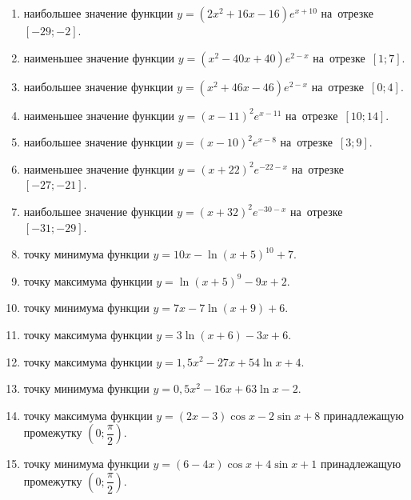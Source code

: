 \documentclass[a4paper,10pt]{article}
\begin{document}
\begin{enumerate}
\item {} наибольшее значение функции $y=\left(2x^2 +16x -16\right)e^{x+10}$ на~отрезке~$\left[-29;-2\right]$.

\item {} наименьшее значение функции $y=\left(x^2 -40x +40\right)e^{2-x}$ на~отрезке~$\left[1;7\right]$.

\item {} наибольшее значение функции $y=\left(x^2 +46x -46\right)e^{2-x}$ на~отрезке~$\left[0;4\right]$.

\item {} наименьшее значение функции $y=\left(x-11\right)^2e^{x-11}$ на~отрезке~$\left[10;14\right]$.

\item {} наибольшее значение функции $y=\left(x-10\right)^2e^{x-8}$ на~отрезке~$\left[3;9\right]$.

\item {} наименьшее значение функции $y=\left(x+22\right)^2e^{-22-x}$ на~отрезке~$\left[-27;-21\right]$.

\item {} наибольшее значение функции $y=\left(x+32\right)^2e^{-30-x}$ на~отрезке~$\left[-31;-29\right]$.

\item {} точку минимума функции $y=10x-\ln\left(x+5\right)^{10}+7$.

\item {} точку максимума функции $y=\ln\left(x+5\right)^{9}-9x+2$.

\item {} точку минимума функции $y=7x-7\ln\left(x+9\right)+6$.

\item {} точку максимума функции $y=3\ln\left(x+6\right)-3x+6$.

\item {} точку максимума функции $y=1,5x^2-27x+54\ln x +4$.

\item {} точку минимума функции $y=0,5x^2-16x+63\ln x -2$.

\item {} точку максимума функции $y=\left(2x-3\right)\cos x -2\sin x+8$
принадлежащую промежутку $\left(0;\dfrac{\pi}{2}\right)$.

\item {} точку минимума функции $y=\left(6-4x\right)\cos x +4\sin x+1$
принадлежащую промежутку $\left(0;\dfrac{\pi}{2}\right)$.


\end{enumerate}
\end{document}

